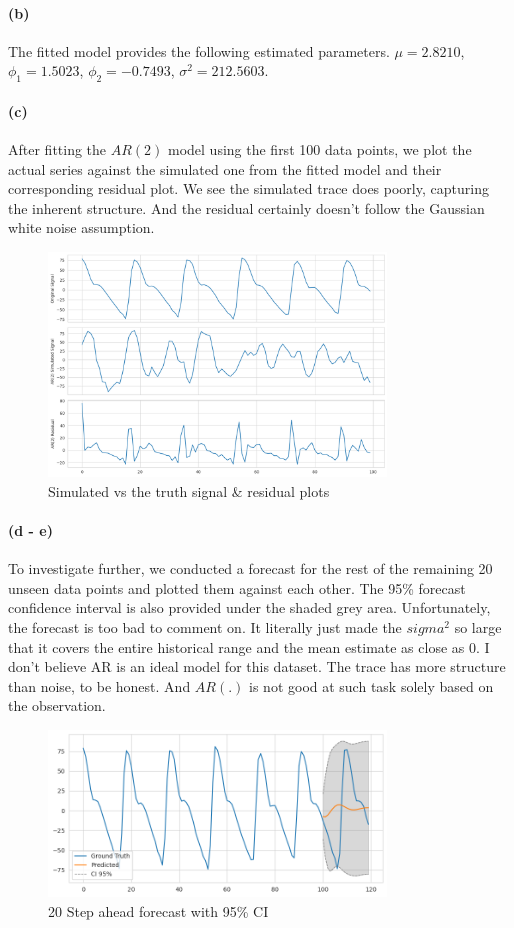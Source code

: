 \documentclass[11pt, letterpaper]{article}
\begin{document}
\paragraph{(b)} The fitted model provides the following estimated parameters. $\mu=2.8210$, $\phi_1 = 1.5023$, $\phi_2 = -0.7493$, $\sigma^2 = 212.5603$.

\paragraph{(c)} After fitting the $AR(2)$ model using the first 100 data points, we plot the actual series against the simulated one from the fitted model and their corresponding residual plot. We see the simulated trace does poorly, capturing the inherent structure. And the residual certainly doesn't follow the Gaussian white noise assumption.
\begin{figure}[!h]
  \centering
  \includegraphics[width=0.8\textwidth]{plot2.png}
  \captionsetup{justification=centering}
  \caption{Simulated vs the truth signal & residual plots}
\end{figure}

\paragraph{(d - e)} To investigate further, we conducted a forecast for the rest of the remaining 20 unseen data points and plotted them against each other. The 95\% forecast confidence interval is also provided under the shaded grey area. Unfortunately, the forecast is too bad to comment on. It literally just made the $sigma^2$ so large that it covers the entire historical range and the mean estimate as close as 0. I don't believe AR is an ideal model for this dataset. The trace has more structure than noise, to be honest. And $AR(.)$ is not good at such task solely based on the observation.

\begin{figure}[!h]
  \centering
  \includegraphics[width=0.8\textwidth]{plot3.png}
  \captionsetup{justification=centering}
  \caption{20 Step ahead forecast with 95\% CI}
\end{figure}
\end{document}
